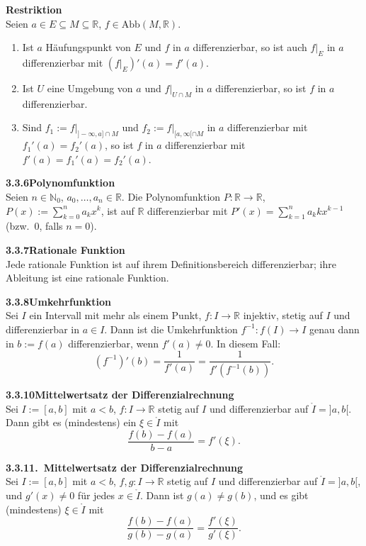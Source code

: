 \documentclass[a4paper,12pt]{article}
\newcommand{\gentry}[3]{%
  \noindent\textbf{#1\quad #2}\nopagebreak\\[0.2em]
  #3\par\smallskip
}
\begin{document}
\gentry{}{Restriktion}{%
  Seien $a \in E \subseteq M \subseteq \mathbb{R}$, $f \in \mathrm{Abb}(M, \mathbb{R})$.
  \begin{enumerate}[label=(\roman*),topsep=2pt,itemsep=1pt]
    \item Ist $a$ H\"aufungspunkt von $E$ und $f$ in $a$ differenzierbar, so ist auch
          $f|_E$ in $a$ differenzierbar mit $(f|_E)'(a) = f'(a)$.
    \item Ist $U$ eine Umgebung von $a$ und $f|_{U \cap M}$ in $a$ differenzierbar,
          so ist $f$ in $a$ differenzierbar.
    \item Sind $f_1 := f|_{]-\infty, a] \cap M}$ und $f_2 := f|_{[a, \infty[ \cap M}$
          in $a$ differenzierbar mit $f_1'(a) = f_2'(a)$, so ist $f$ in $a$
          differenzierbar mit $f'(a) = f_1'(a) = f_2'(a)$.
  \end{enumerate}
}

\gentry{3.3.6}{Polynomfunktion}{%
  Seien $n \in \mathbb{N}_0$, $a_0, \ldots, a_n \in \mathbb{R}$. Die Polynomfunktion
  $P : \mathbb{R} \to \mathbb{R}$, $P(x) := \sum_{k=0}^n a_k x^k$, ist auf $\mathbb{R}$
  differenzierbar mit
  $P'(x) = \sum_{k=1}^n a_k k x^{k-1}$ (bzw.\ $0$, falls $n = 0$).
}

\gentry{3.3.7}{Rationale Funktion}{%
  Jede rationale Funktion ist auf ihrem Definitionsbereich differenzierbar; ihre
  Ableitung ist eine rationale Funktion.
}

\gentry{3.3.8}{Umkehrfunktion}{%
  Sei $I$ ein Intervall mit mehr als einem Punkt, $f : I \to \mathbb{R}$ injektiv,
  stetig auf $I$ und differenzierbar in $a \in I$. Dann ist die Umkehrfunktion
  $f^{-1} : f(I) \to I$ genau dann in $b := f(a)$ differenzierbar, wenn $f'(a) \neq 0$.
  In diesem Fall:
  \[
    (f^{-1})'(b) = \frac{1}{f'(a)} = \frac{1}{f'(f^{-1}(b))}.
  \]
}

\gentry{3.3.10}{Mittelwertsatz der Differenzialrechnung}{%
  Sei $I := [a, b]$ mit $a < b$, $f : I \to \mathbb{R}$ stetig auf $I$ und differenzierbar
  auf $\mathring I = ]a, b[$. Dann gibt es (mindestens) ein $\xi \in \mathring I$ mit
  \[
    \frac{f(b) - f(a)}{b - a} = f'(\xi).
  \]
}

\gentry{3.3.11}{2.~Mittelwertsatz der Differenzialrechnung}{%
  Sei $I := [a, b]$ mit $a < b$, $f, g : I \to \mathbb{R}$ stetig auf $I$ und
  differenzierbar auf $\mathring I = ]a, b[$, und $g'(x) \neq 0$ f\"ur jedes
  $x \in \mathring I$. Dann ist $g(a) \neq g(b)$, und es gibt (mindestens)
  $\xi \in \mathring I$ mit
  \[
    \frac{f(b) - f(a)}{g(b) - g(a)} = \frac{f'(\xi)}{g'(\xi)}.
  \]
}
\end{document}
